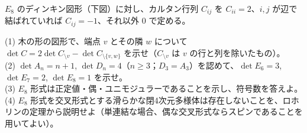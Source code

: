 \begin{problem}[難易度 B]\label{ch06-prob-e8}
$E_8$ のディンキン図形（下図）に対し、カルタン行列 $C_{ij}$ を $C_{ii}=2$、$i,j$ が辺で結ばれていれば $C_{ij}=-1$、それ以外 $0$ で定める。
\begin{center}
\end{center}
(1) 木の形の図形で、端点 $v$ とその隣 $w$ について $\det C=2\det C_{\setminus v}-\det C_{\setminus\{v,w\}}$ を示せ（$C_{\setminus v}$ は $v$ の行と列を除いたもの）。\\
(2) $\det A_n=n+1$, $\det D_n=4$（$n\ge3$；$D_3=A_3$）を認めて、$\det E_6=3$, $\det E_7=2$, $\det E_8=1$ を示せ。\\
(3) $E_8$ 形式は正定値・偶・ユニモジュラーであることを示し、符号数を答えよ。\\
(4) $E_8$ 形式を交叉形式とする滑らかな閉4次元多様体は存在しないことを、ロホリンの定理から説明せよ（単連結な場合、偶な交叉形式ならスピンであることを用いてよい）。
\end{problem}

